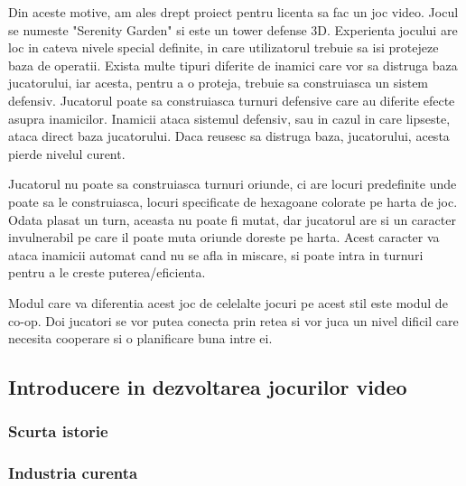 \documentclass[12pt, a4paper]{article}
\begin{document}
	Din aceste motive, am ales drept proiect pentru licenta sa fac un joc video. Jocul se numeste "Serenity Garden" si este un tower defense 3D. Experienta jocului are loc in cateva nivele special definite, in care utilizatorul trebuie sa isi protejeze baza de operatii. Exista multe tipuri diferite de inamici care vor sa distruga baza jucatorului, iar acesta, pentru a o proteja, trebuie sa construiasca un sistem defensiv. Jucatorul poate sa construiasca turnuri defensive care au diferite efecte asupra inamicilor. Inamicii ataca sistemul defensiv, sau in cazul in care lipseste, ataca direct baza jucatorului. Daca reusesc sa distruga baza, jucatorului, acesta pierde nivelul curent.
	\newline
	
	Jucatorul nu poate sa construiasca turnuri oriunde, ci are locuri predefinite unde poate sa le construiasca, locuri specificate de hexagoane colorate pe harta de joc. Odata plasat un turn, aceasta nu poate fi mutat, dar jucatorul are si un caracter invulnerabil pe care il poate muta oriunde doreste pe harta. Acest caracter va ataca inamicii automat cand nu se afla in miscare, si poate intra in turnuri pentru a le creste puterea/eficienta.
	\newline
	
	Modul care va diferentia acest joc de celelalte jocuri pe acest stil este modul de co-op. Doi jucatori se vor putea conecta prin retea si vor juca un nivel dificil care necesita cooperare si o planificare buna intre ei.
	
	
	
	
	
	\subsection{Introducere in dezvoltarea jocurilor video}
	
	
	
	
	
	
	\subsubsection{Scurta istorie}
	
	
	
	
	
	
	\subsubsection{Industria curenta}
	
	
	
\end{document}
